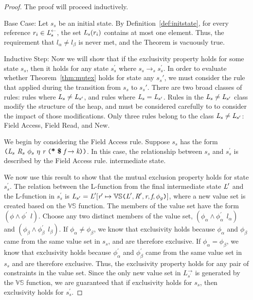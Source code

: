 \begin{proof}
The proof will proceed inductively. 

Base Case: Let $s_s$ be an initial state. By Definition~\ref{def:initstate}, for every reference $r_i \in \emph{L}_s^\leftarrow$, the set $\emph{L}_s(r_i)$ contains at most one element. Thus, the requirement that $l_\alpha \ne l_\beta$ is never met, and the Theorem is vacuously true.

Inductive Step: Now we will show that if the exclusivity property holds for some state $s_s$, then it holds for any state $s_s^\prime$ where $s_s \rightarrow_s s_s^\prime$. In order to evaluate whether Theorem~\ref{thm:mutex} holds for state any $s_s\prime$, we must consider the rule that applied during the transition from $s_s$ to $s_s\prime$. There are two broad classes of rules: rules where $ \emph{L}_s \neq  \emph{L}_{s^\prime}$, and rules where $ \emph{L}_s =  \emph{L}_{s^\prime}$. Rules in the $ \emph{L}_s \neq  \emph{L}_{s^\prime}$ class modify the structure of the heap, and must be considered carefully to to consider the impact of those modifications. Only three rules belong to the class $ \emph{L}_s \neq  \emph{L}_{s^\prime}$: Field Access, Field Read, and New. 

We begin by considering the Field Access rule. Suppose $s_s$ has the form $\lp \cfgnt{L}_s\ \cfgnt{R}_{s}\ \phi_s\ \eta\ \cfgnt{r}\ \lp \cfgt{*}\ \cfgt{\$}\ \cfgnt{f} \rightarrow \cfgnt{k}\rp \rp$. In this case, the relationship between $s_s$ and $s_s^\prime$ is described by the Field Access rule. intermediate state.

We now use this result to show that the mutual exclusion property holds for state $s_s^\prime$. The relation between the L-function from the final intermediate state $\emph{L}^\prime$ and the L-function in $s_s^\prime$ is $ \emph{L}_{s^\prime} = \emph{L}^\prime[\emph{r}^\prime \mapsto \mathbb{VS}\texttt{(} \emph{L}^\prime,\emph{R}^\prime,\emph{r},\emph{f},\phi_g\texttt{)} ]$, where a new value set is created based on the $\mathbb{VS}$ function. The members of the value set have the form $(\phi\wedge \phi^\prime\ \ l)$. Choose any two distinct members of the value set, $(\phi_\alpha \wedge \phi_\alpha^\prime\ \ l_\alpha)$ and $(\phi_\beta \wedge \phi_\beta^\prime\ \ l_\beta)$. If $\phi_\alpha \ne \phi_\beta$, we know that exclusivity holds because $\phi_\alpha$ and $\phi_\beta$ came from the same value set in $s_s$, and are therefore exclusive. If $\phi_\alpha = \phi_\beta$, we know that exclusivity holds because $\phi_\alpha^\prime$ and $\phi_\beta^\prime$ came from the same value set in $s_s$ and are therefore exclusive. Thus, the exclusivity property holds for any pair of constraints in the value set. Since the only new value set in $L_{s^\prime}^\rightarrow$ is generated by the $\mathbb{VS}$ function, we are guaranteed that if exclusivity holds for $s_s$, then exclusivity holds for $s_s^\prime$.


\end{proof}
